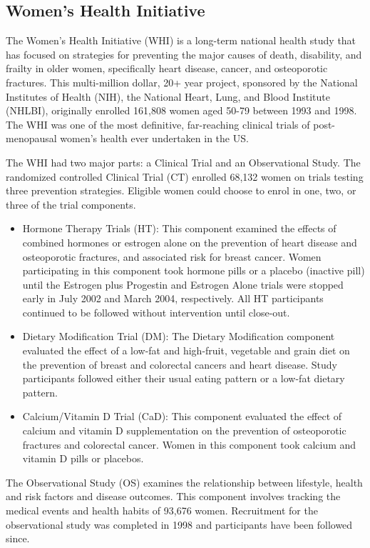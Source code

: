 \subsection{Women's Health Initiative}
\label{apx:whi_exp}
The Women's Health Initiative (WHI) is a long-term national health study that has focused on strategies for preventing the major causes of death, disability, and frailty in older women, specifically heart disease, cancer, and osteoporotic fractures. This multi-million dollar, 20+ year project, sponsored by the National Institutes of Health (NIH), the National Heart, Lung, and Blood Institute (NHLBI), originally enrolled 161,808 women aged 50-79 between 1993 and 1998. The WHI was one of the most definitive, far-reaching clinical trials of post-menopausal women's health ever undertaken in the US.  

The WHI had two major parts: a Clinical Trial and an Observational Study. The randomized controlled Clinical Trial (CT) enrolled 68,132 women on trials testing three prevention strategies. Eligible women could choose to enrol in one, two, or three of the trial components.
\begin{itemize}
\item Hormone Therapy Trials (HT): This component examined the effects of combined hormones or estrogen alone on the prevention of heart disease and osteoporotic fractures, and associated risk for breast cancer. Women participating in this component took hormone pills or a placebo (inactive pill) until the Estrogen plus Progestin and Estrogen Alone trials were stopped early in July 2002 and March 2004, respectively. All HT participants continued to be followed without intervention until close-out.
\item 	Dietary Modification Trial (DM): The Dietary Modification component evaluated the effect of a low-fat and high-fruit, vegetable and grain diet on the prevention of breast and colorectal cancers and heart disease. Study participants followed either their usual eating pattern or a low-fat dietary pattern.
\item Calcium/Vitamin D Trial (CaD): This component evaluated the effect of calcium and vitamin D supplementation on the prevention of osteoporotic fractures and colorectal cancer. Women in this component took calcium and vitamin D pills or placebos.
\end{itemize}
The Observational Study (OS) examines the relationship between lifestyle, health and risk factors and disease outcomes. This component involves tracking the medical events and health habits of 93,676 women. Recruitment for the observational study was completed in 1998 and participants have been followed since.




